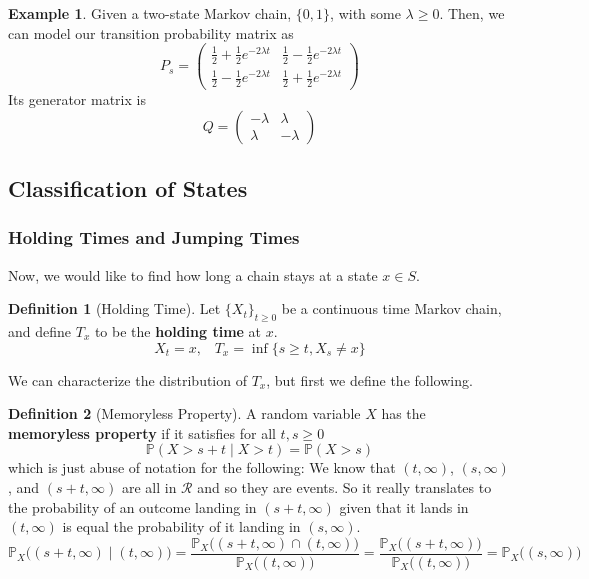 \documentclass{article}
\theoremstyle{definition}
\newtheorem{example}{Example}[section]
\theoremstyle{remark}
\theoremstyle{definition}
\newtheorem{definition}{Definition}[section]
\begin{document}
\begin{example}
Given a two-state Markov chain, $\{0, 1\}$, with some $\lambda \geq 0$. Then, we can model our transition probability matrix as 
\[P_s  = \begin{pmatrix} \frac{1}{2} + \frac{1}{2} e^{-2\lambda t} &  \frac{1}{2} - \frac{1}{2} e^{-2\lambda t} \\  \frac{1}{2} - \frac{1}{2} e^{-2\lambda t} &  \frac{1}{2} + \frac{1}{2} e^{-2\lambda t} \end{pmatrix} \]
Its generator matrix is 
\[Q = \begin{pmatrix} -\lambda & \lambda \\ \lambda & -\lambda \end{pmatrix}\]
\end{example}

\subsection{Classification of States}

\subsubsection{Holding Times and Jumping Times}

Now, we would like to find how long a chain stays at a state $x \in S$. 

\begin{definition}[Holding Time]
Let $\{X_t\}_{t \geq 0}$ be a continuous time Markov chain, and define $T_x$ to be the \textbf{holding time} at $x$. 
\[X_t = x, \;\;\; T_x = \inf\{s \geq t, X_s \neq x\} \]
\end{definition}

We can characterize the distribution of $T_x$, but first we define the following. 

\begin{definition}[Memoryless Property]
A random variable $X$ has the \textbf{memoryless property} if it satisfies for all $t, s \geq 0$ 
\[\mathbb{P}(X > s + t \mid X > t) = \mathbb{P}(X > s)\]
which is just abuse of notation for the following: We know that $(t, \infty)$, $(s, \infty)$, and $(s + t, \infty)$ are all in $\mathcal{R}$ and so they are events. So it really translates to the probability of an outcome landing in $(s + t, \infty)$ given that it lands in $(t, \infty)$ is equal the probability of it landing in $(s, \infty)$. 
\[\mathbb{P}_X \big( (s + t, \infty) \mid (t, \infty) \big) = \frac{\mathbb{P}_X \big( (s + t, \infty) \cap (t, \infty) \big)}{\mathbb{P}_X \big( (t, \infty) \big)} = \frac{\mathbb{P}_X \big( (s + t, \infty) \big)}{\mathbb{P}_X \big( (t, \infty) \big)} = \mathbb{P}_X \big( (s, \infty) \big)\]
\end{definition}
\end{document}
